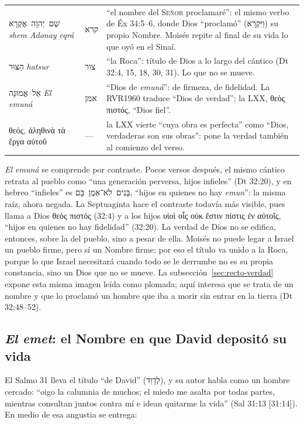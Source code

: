 \documentclass[11pt,letterpaper]{article}
\newcommand{\heb}[1]{\mbox{\foreignlanguage{hebrew}{#1}}}
\newcommand{\grc}[1]{\foreignlanguage{ancientgreek}{#1}}
\newcommand{\SENOR}{\textsc{Señor}}
\begin{document}
\begin{filologia}[Dt 32:3--4]
\begin{tabular}{@{}L{3.2cm}L{1.6cm}L{10cm}@{}}
\heb{שֵׁם יְהוָה אֶקְרָא} \emph{shem Adonay eqrá} & \heb{קרא} & ``el nombre del \SENOR{} proclamaré'': el mismo verbo de Éx 34:5--6, donde Dios ``proclamó'' (\heb{וַיִּקְרָא}) su propio Nombre. Moisés repite al final de su vida lo que oyó en el Sinaí. \\[2pt]
\heb{הַצּוּר} \emph{hatsur} & \heb{צור} & ``la Roca'': título de Dios a lo largo del cántico (Dt 32:4, 15, 18, 30, 31). Lo que no se mueve. \\[2pt]
\heb{אֵל אֱמוּנָה} \emph{El emuná} & \heb{אמן} & ``Dios de \emph{emuná}'': de firmeza, de fidelidad. La RVR1960 traduce ``Dios de verdad''; la LXX, \grc{θεὸς πιστός}, ``Dios fiel''. \\[2pt]
\grc{θεός, ἀληθινὰ τὰ ἔργα αὐτοῦ} & --- & la LXX vierte ``cuya obra es perfecta'' como ``Dios, verdaderas son sus obras'': pone la verdad también al comienzo del verso. \\
\end{tabular}
\end{filologia}

\emph{El emuná} se comprende por contraste. Pocos versos después, el mismo cántico retrata al pueblo como ``una generación perversa, hijos infieles'' (Dt 32:20), y en hebreo ``infieles'' es \heb{בָּנִים לֹא־אֵמֻן בָּם}, ``hijos en quienes no hay \emph{emun}'': la misma raíz, ahora negada. La Septuaginta hace el contraste todavía más visible, pues llama a Dios \grc{θεὸς πιστός} (32:4) y a los hijos \grc{υἱοὶ οἷς οὐκ ἔστιν πίστις ἐν αὐτοῖς}, ``hijos en quienes no hay fidelidad'' (32:20). La verdad de Dios no se edifica, entonces, sobre la del pueblo, sino a pesar de ella. Moisés no puede legar a Israel un pueblo firme, pero sí un Nombre firme; por eso el título va unido a la Roca, porque lo que Israel necesitará cuando todo se le derrumbe no es su propia constancia, sino un Dios que no se mueve. La subsección~\ref{sec:recto-verdad} expone esta misma imagen leída como plomada; aquí interesa que se trata de un nombre y que lo proclamó un hombre que iba a morir sin entrar en la tierra (Dt 32:48--52).

\subsection{\emph{El emet}: el Nombre en que David depositó su vida}
El Salmo 31 lleva el título ``de David'' (\heb{לְדָוִד}), y su autor habla como un hombre cercado: ``oigo la calumnia de muchos; el miedo me asalta por todas partes, mientras consultan juntos contra mí e idean quitarme la vida'' (Sal 31:13 [31:14]). En medio de esa angustia se entrega:
\end{document}
